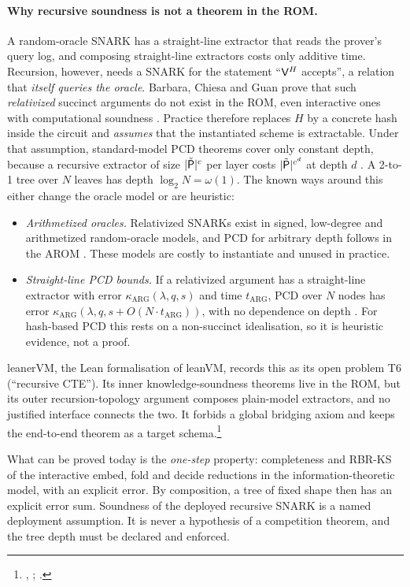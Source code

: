 \paragraph{Why recursive soundness is not a theorem in the ROM.} A random-oracle SNARK has a
straight-line extractor that reads the prover's query log, and composing straight-line extractors
costs only additive time. Recursion, however, needs a SNARK for the statement ``$\mathsf{V}^H$ accepts'',
a relation that \emph{itself queries the oracle}. Barbara, Chiesa and Guan prove that such
\emph{relativized} succinct arguments do not exist in the ROM, even interactive ones with
computational soundness \cite{BCG24-RelROM}. Practice therefore replaces $H$ by a concrete hash
inside the circuit and \emph{assumes} that the instantiated scheme is extractable. Under that
assumption, standard-model PCD theorems cover only constant depth, because a recursive extractor
of size $|\tilde{\mathsf{P}}|^c$ per layer costs $|\tilde{\mathsf{P}}|^{c^d}$ at depth $d$
\cite[Rmk.~5.3]{BCMS20}. A 2-to-1 tree over $N$ leaves has depth $\log_2N=\omega(1)$. The known
ways around this either change the oracle model or are heuristic:
\begin{itemize}[nosep]
\item \emph{Arithmetized oracles.} Relativized SNARKs exist in signed, low-degree and arithmetized
  random-oracle models, and PCD for arbitrary depth follows in the AROM \cite{CCS22,CCGOS23-AROM}.
  These models are costly to instantiate and unused in practice.
\item \emph{Straight-line PCD bounds.} If a relativized argument has a straight-line extractor
  with error $\kappa_{\mathrm{ARG}}(\lambda,q,s)$ and time $t_{\mathrm{ARG}}$, PCD over $N$ nodes
  has error $\kappa_{\mathrm{ARG}}(\lambda,q,s+O(N\cdot t_{\mathrm{ARG}}))$, with no dependence on
  depth \cite{CGSY24}. For hash-based PCD this rests on a non-succinct idealisation, so it is
  heuristic evidence, not a proof.
\end{itemize}
leanerVM, the Lean formalisation of leanVM, records this as its open problem T6 (``recursive
CTE''). Its inner knowledge-soundness theorems live in the ROM, but its outer recursion-topology
argument composes plain-model extractors, and no justified interface connects the two. It forbids
a global bridging axiom and keeps the end-to-end theorem as a target schema.\footnote{,
; .}

\begin{takeaway}
What can be proved today is the \emph{one-step} property: completeness and RBR-KS of the
interactive embed, fold and decide reductions in the information-theoretic model, with an
explicit error. By composition, a tree of fixed shape then has an explicit error sum. Soundness of
the deployed recursive SNARK is a named deployment assumption. It is never a hypothesis of a
competition theorem, and the tree depth must be declared and enforced.
\end{takeaway}

